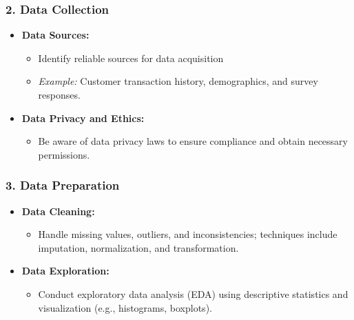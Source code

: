 \documentclass[aspectratio=169]{beamer}
\begin{document}
\begin{frame}[fragile]
    \frametitle{2. Data Collection}
    \begin{itemize}
        \item \textbf{Data Sources:}
            \begin{itemize}
                \item Identify reliable sources for data acquisition 
                \item \textit{Example:} Customer transaction history, demographics, and survey responses.
            \end{itemize}
        \item \textbf{Data Privacy and Ethics:}
            \begin{itemize}
                \item Be aware of data privacy laws to ensure compliance and obtain necessary permissions.
            \end{itemize}
    \end{itemize}
\end{frame}

\begin{frame}[fragile]
    \frametitle{3. Data Preparation}
    \begin{itemize}
        \item \textbf{Data Cleaning:}
            \begin{itemize}
                \item Handle missing values, outliers, and inconsistencies; techniques include imputation, normalization, and transformation.
            \end{itemize}
        \item \textbf{Data Exploration:}
            \begin{itemize}
                \item Conduct exploratory data analysis (EDA) using descriptive statistics and visualization (e.g., histograms, boxplots).
            \end{itemize}
    \end{itemize}
\end{frame}
\end{document}
